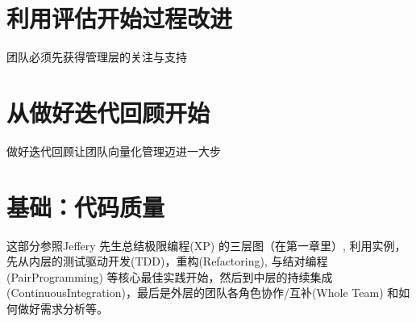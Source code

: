 \documentclass{book}        %
\begin{document}



\part{利用评估开始过程改进}团队必须先获得管理层的关注与支持\\



\part{从做好迭代回顾开始 }做好迭代回顾让团队向量化管理迈进一大步\\



\part{基础：代码质量}这部分参照Jeffery 先生总结极限编程(XP) 的三层图（在第一章里）, 利用实例，先从内层的测试驱动开发(TDD)，重构(Refactoring), 与结对编程(PairProgramming) 等核心最佳实践开始，然后到中层的持续集成(ContinuousIntegration)，最后是外层的团队各角色协作/互补(Whole Team) 和如何做好需求分析等。
\end{document}

